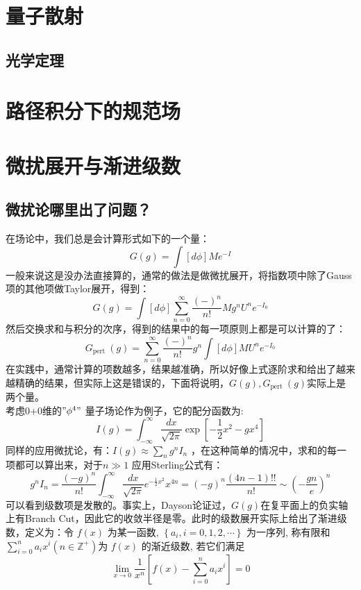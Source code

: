 \documentclass[10pt,openany]{book}
\theoremstyle{thmstyle} %
\theoremstyle{defstyle} %
\theoremstyle{prostyle} %
\begin{document}
\section{量子散射}
\subsection{光学定理}
\section{路径积分下的规范场}
\section{微扰展开与渐进级数}
\subsection*{微扰论哪里出了问题？}
在场论中，我们总是会计算形式如下的一个量：
\begin{equation}
  G(g)=\int[d \phi] M e^{-I}
\end{equation}
一般来说这是没办法直接算的，通常的做法是做微扰展开，将指数项中除了Gauss项的其他项做Taylor展开，得到：
\begin{equation}
  G(g)=\int[d \phi] \sum_{n=0}^{\infty} \frac{(-)^n}{n !} M g^n U^n e^{-I_0}
\end{equation}
然后交换求和与积分的次序，得到的结果中的每一项原则上都是可以计算的了：
\begin{equation}
  G_{\text {pert }}(g)=\sum_{n=0}^{\infty} \frac{(-)^n}{n !} g^n \int[d \phi] M U^n e^{-I_0}
\end{equation}
在实践中，通常计算的项数越多，结果越准确，所以好像上式逐阶求和给出了越来越精确的结果，但实际上这是错误的，下面将说明，$ G(g),G_{\text {pert }}(g) $实际上是两个量。\\

考虑0+0维的$ "\phi^4" $ 量子场论作为例子，它的配分函数为:
\begin{equation}
  I(g)=\int_{-\infty}^{\infty} \frac{d x}{\sqrt{2 \pi}} \exp \left[-\frac{1}{2} x^2-g x^4\right]
\end{equation}
同样的应用微扰论，有：$ I(g) \approx \sum_n g^n I_n $ ，在这种简单的情况中，求和的每一项都可以算出来，对于$ n \gg 1 $ 应用Sterling公式有：
\begin{equation}
  g^n I_n=\frac{(-g)^n}{n !} \int_{-\infty}^{\infty} \frac{d x}{\sqrt{2 \pi}} e^{-\frac{1}{2} x^2} x^{4 n}=(-g)^n \frac{(4 n-1) ! !}{n !} \sim \left(-\frac{g n}{e}\right)^n
\end{equation}
可以看到级数项是发散的。事实上，Dayson论证过，$ G(g) $在复平面上的负实轴上有Branch Cut，因此它的收敛半径是零。此时的级数展开实际上给出了渐进级数，定义为：令 $f(x)$ 为某一函数, $\left\{a_i, i=0,1,2, \cdots\right\}$ 为一序列, 称有限和 $\sum_{i=0}^n a_i x^i\left(n \in \mathbb{Z}^{+}\right)$为 $f(x)$ 的渐近级数, 若它们满足
\begin{equation}
  \lim _{x \rightarrow 0} \frac{1}{x^n}\left[f(x)-\sum_{i=0}^n a_i x^i\right]=0
\end{equation}
\end{document}
